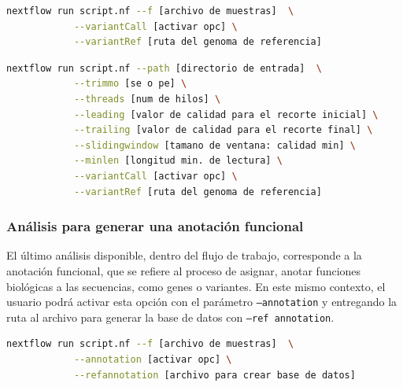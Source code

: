 \documentclass[12pt]{article}
\begin{document}
\begin{center}
    \begin{lstlisting}[language=bash, caption=Comando para ejecutar un análisis rápido de llamado de variantes \emph{(elaboración propia)}., label=lst:variantesFast]
        nextflow run script.nf --f [archivo de muestras]  \
            --variantCall [activar opc] \
            --variantRef [ruta del genoma de referencia]
    \end{lstlisting}
\end{center}

\begin{center}
    \begin{lstlisting}[language=bash, caption=Comando para la ejecución de un análisis de llamado de variantes \emph{(elaboración propia)}., label=lst:VARIANTES]
        nextflow run script.nf --path [directorio de entrada]  \
            --trimmo [se o pe] \
            --threads [num de hilos] \
            --leading [valor de calidad para el recorte inicial] \
            --trailing [valor de calidad para el recorte final] \
            --slidingwindow [tamano de ventana: calidad min] \
            --minlen [longitud min. de lectura] \
            --variantCall [activar opc] \
            --variantRef [ruta del genoma de referencia]
    \end{lstlisting}
\end{center}

\subsubsection*{Análisis para generar una anotación funcional}

El último análisis disponible, dentro del flujo de trabajo, 
corresponde a  la anotación funcional, que se refiere al 
proceso de asignar, anotar funciones biológicas a las secuencias, 
como genes o variantes. En este mismo contexto, el usuario podrá 
activar esta opción con el parámetro \texttt{--annotation} y entregando la
ruta al archivo para generar la base de datos con \texttt{--ref annotation}.

\begin{center}
    \begin{lstlisting}[language=bash, caption=Comando para ejecutar un análisis rápido de anotación funcional \emph{(elaboración propia)}., label=lst:annotationFast]
        nextflow run script.nf --f [archivo de muestras]  \
            --annotation [activar opc] \
            --refannotation [archivo para crear base de datos]
    \end{lstlisting}
\end{center}
\end{document}
